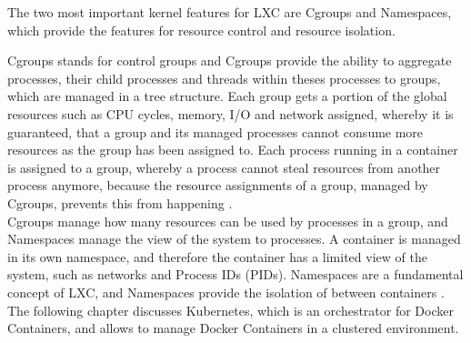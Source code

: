 The two most important kernel features for LXC are Cgroups and Namespaces, which provide the features for resource control and resource isolation. 

Cgroups stands for control groups and Cgroups provide the ability to aggregate processes, their child processes and threads within theses processes to groups, which are managed in a tree structure. Each group gets a portion of the global resources such as CPU cycles, memory, I/O and network assigned, whereby it is guaranteed, that a group and its managed processes cannot consume more resources as the group has been assigned to. Each process running in a container is assigned to a group, whereby a process cannot steal resources from another process anymore, because the resource assignments of a group, managed by Cgroups, prevents this from happening \cite{KernelCGroupsV12018, KernelCGroupV22015, IntelLXCHyperVisor2014}. \\

Cgroups manage how many resources can be used by processes in a group, and Namespaces manage the view of the system to processes. A container is managed in its own namespace, and therefore the container has a limited view of the system, such as networks and Process IDs (PIDs). Namespaces are a fundamental concept of LXC, and Namespaces provide the isolation of between containers \cite{LinuxNamespaces2018, IntelLXCHyperVisor2014}. \\

The following chapter discusses Kubernetes, which is an orchestrator for Docker Containers, and allows to manage Docker Containers in a clustered environment. 
 

